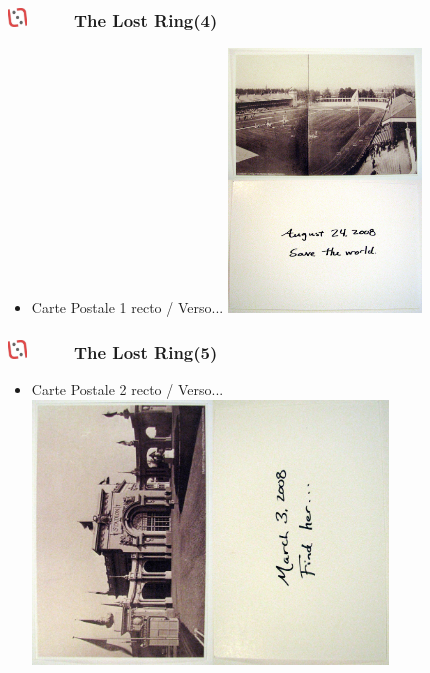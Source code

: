 \documentclass[slidetop,11pt]{beamer}
\def\sectionPartIIaIV{The Lost Ring}
\def\moreInFrameTitleLeftt{\includegraphics[height=0.5cm]{img/ligueludique-0.png}~~~~~}
\begin{document}
\begin{frame}
	\frametitle{\moreInFrameTitleLeftt \sectionPartIIaIV  (4) }
	\begin{itemize}
		\item Carte Postale 1 recto / Verso...
		\includegraphics[height=7.00cm]{img/argTheLostRing/2299369980_6cd3e50860_o.jpg}
	\end{itemize}
\end{frame} 

\begin{frame}
	\frametitle{\moreInFrameTitleLeftt \sectionPartIIaIV  (5) }
	\begin{itemize}
		\item Carte Postale 2 recto / Verso...
		\includegraphics[height=7.00cm]{img/argTheLostRing/2299370206_89505225a9_o.jpg}
	\end{itemize}
\end{frame} 
\end{document}
